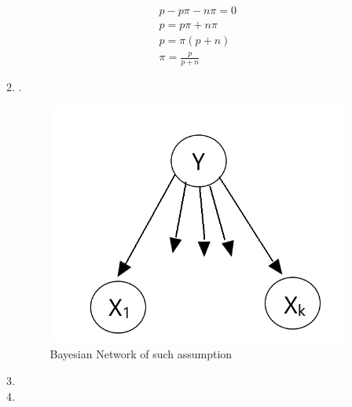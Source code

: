\documentclass[letterpaper, 12pt]{article}
\begin{document}
\begin{enumerate}
\begin{enumerate}
\begin{gather*}
                      p-p\pi-n\pi = 0 \\
                      p = p\pi+n\pi \\
                      p = \pi(p+n) \\
                      \pi = \frac{p}{p+n}
                  \end{gather*}
            \item .
                  \begin{figure}[H]
                      \centering
                      \includegraphics[width=0.5\linewidth]{q2_c.png}
                      \caption{Bayesian Network of such assumption }
                  \end{figure}
            \item
            \item


\end{enumerate}
\end{enumerate}
\end{document}
